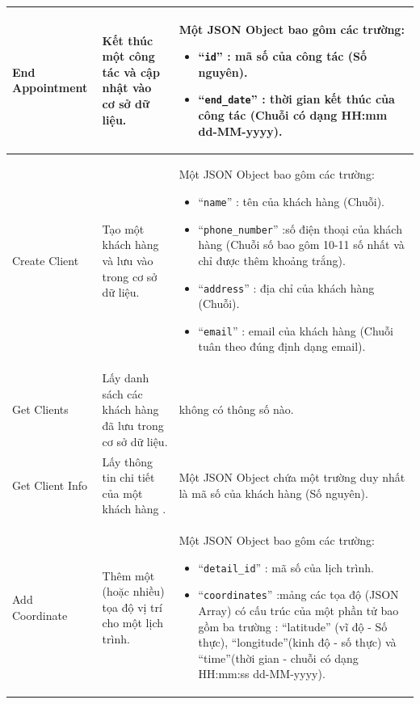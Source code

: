 \documentclass[a4paper]{article}
\begin{document}
\begin{longtable}{ | p{} |p{} | p{}  | }
\hline
End Appointment  & 
Kết thúc một công tác và cập nhật vào cơ sở dữ liệu. &
Một JSON Object bao gôm các trường: 
\begin{itemize}
  \item “\verb|id|” : mã số của công tác (Số nguyên).  
  \item “\verb|end_date|” : thời gian kết thúc của công tác (Chuỗi có dạng HH:mm dd-MM-yyyy).
\end{itemize}
\\ 

\hline
Create Client & 
Tạo một khách hàng và lưu vào trong cơ sở dữ liệu. &
Một JSON Object bao gôm các trường: 
\begin{itemize}
  \item “\verb|name|” : tên của khách hàng (Chuỗi).  
  \item “\verb|phone_number|” :số điện thoại của khách hàng (Chuỗi số bao gôm 10-11 số nhất và chỉ được thêm khoảng trắng). 
  \item “\verb|address|” :  địa chỉ của khách hàng (Chuỗi).
  \item “\verb|email|” : email của khách hàng (Chuỗi tuân theo đúng định dạng email).
\end{itemize}
\\ 

\hline
Get Clients & 
Lấy danh sách các khách hàng đã lưu trong cơ sở dữ liệu. &
không có thông số nào.
\\ 

\hline
Get Client Info & 
Lấy thông tin chi tiết của một khách hàng . &
Một JSON Object chứa một trường duy nhất là mã số của khách hàng (Số nguyên).
\\ 

\hline
Add Coordinate & 
Thêm một (hoặc nhiều) tọa độ vị trí cho một lịch trình. &
Một JSON Object bao gôm các trường: 
\begin{itemize}
  \item “\verb|detail_id|” : mã số của lịch trình.  
\item “\verb|coordinates|” :mảng các tọa độ (JSON Array) có cấu trúc của một phần tử bao gồm ba trường : “latitude” (vĩ độ - Số thực), “longitude”(kinh độ - số thực) và
“time”(thời gian - chuỗi có dạng HH:mm:ss dd-MM-yyyy).
\end{itemize}
\\ 


\end{longtable}
\end{document}
